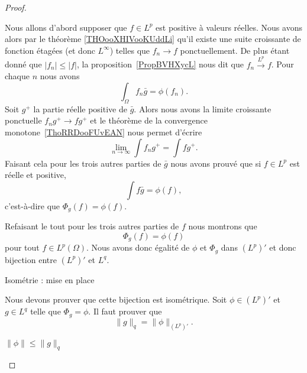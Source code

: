 \begin{proof}
\begin{subproof}
            Nous allons d'abord supposer que \( f\in L^p\) est positive à valeurs réelles. Nous avons alors par le théorème \ref{THOooXHIVooKUddLi} qu'il existe une suite croissante de fonction étagées (et donc \( L^{\infty}\)) telles que \( f_n\to f\) ponctuellement. De plus étant donné que \( | f_n |\leq | f |\), la proposition~\ref{PropBVHXycL} nous dit que \( f_n\stackrel{L^p}{\longrightarrow}f\). Pour chaque \( n\) nous avons
            \begin{equation}
                \int_{\Omega}f_n\bar g=\phi(f_n).
            \end{equation}
            Soit \( g^+\) la partie réelle positive de \( \bar g\). Alors nous avons la limite croissante ponctuelle \( f_ng^+\to fg^+\) et le théorème de la convergence monotone~\ref{ThoRRDooFUvEAN} nous permet d'écrire
            \begin{equation}
                \lim_{n\to \infty} \int f_ng^+=\int fg^+.
            \end{equation}
            Faisant cela pour les trois autres parties de \( \bar g\) nous avons prouvé que si \( f\in L^p\) est réelle et positive,
            \begin{equation}
                \int f\bar g=\phi(f),
            \end{equation}
            c'est-à-dire que \( \Phi_g(f)=\phi(f)\).

            Refaisant le tout pour les trois autres parties de \( f\) nous montrons que
            \begin{equation}
                \Phi_g(f)=\phi(f)
            \end{equation}
            pour tout \( f\in L^p(\Omega)\). Nous avons donc égalité de \( \phi\) et \( \Phi_g\) dans \(  (L^p)' \) et donc bijection entre \( (L^p)'\) et \( L^q\).

        \item[Isométrie : mise en place]

            Nous devons prouver que cette bijection est isométrique. Soit \( \phi\in (L^p)'\) et \( g\in L^q\) telle que \( \Phi_g=\phi\). Il faut prouver que
            \begin{equation}
                \| g \|_q=\| \phi \|_{(L^p)'}.
            \end{equation}

        \item[ \( \| \phi \|\leq \| g \|_q\) ]


\end{subproof}
\end{proof}
